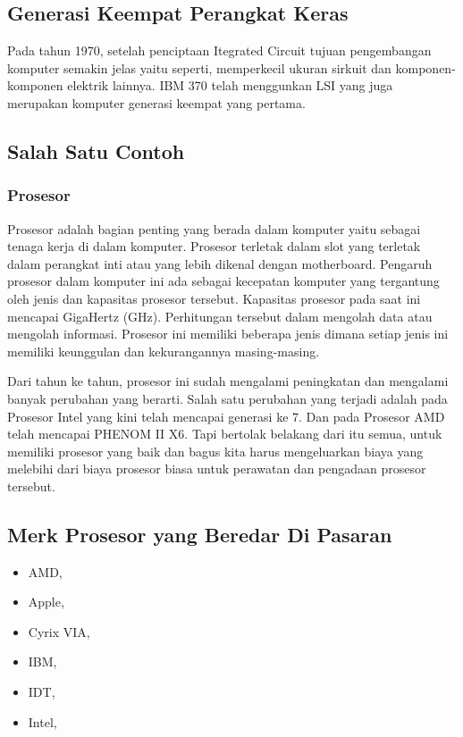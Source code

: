 \subsection{Generasi Keempat Perangkat Keras}
Pada tahun 1970, setelah penciptaan Itegrated Circuit tujuan pengembangan komputer semakin jelas yaitu seperti, memperkecil ukuran
sirkuit dan komponen-komponen elektrik lainnya. IBM 370 telah menggunkan LSI yang juga merupakan komputer generasi keempat yang pertama.

\subsection{Salah Satu Contoh}

\subsubsection{Prosesor}
Prosesor adalah bagian penting yang berada dalam komputer yaitu sebagai tenaga kerja di dalam komputer. Prosesor terletak dalam slot
yang terletak dalam perangkat inti atau yang lebih dikenal dengan motherboard. Pengaruh prosesor dalam komputer ini ada sebagai kecepatan
komputer yang tergantung oleh jenis dan kapasitas prosesor tersebut. Kapasitas prosesor pada saat ini mencapai GigaHertz (GHz).
Perhitungan tersebut dalam mengolah data atau mengolah informasi. Prosesor ini memiliki beberapa jenis dimana setiap jenis ini memiliki 
keunggulan dan kekurangannya masing-masing.

Dari tahun ke tahun, prosesor ini sudah mengalami peningkatan dan mengalami banyak perubahan yang berarti. Salah satu perubahan yang 
terjadi adalah pada Prosesor Intel yang kini telah mencapai generasi ke 7. Dan pada Prosesor AMD telah mencapai PHENOM II X6. Tapi
bertolak belakang dari itu semua, untuk memiliki prosesor yang baik dan bagus kita harus mengeluarkan biaya yang melebihi dari biaya
prosesor biasa untuk perawatan dan pengadaan prosesor tersebut.

\subsection{Merk Prosesor yang Beredar Di Pasaran}
\begin{itemize}	
	\item AMD,
	\item Apple,
	\item Cyrix VIA,
	\item IBM,
	\item IDT,
	\item Intel,
\end{itemize}

